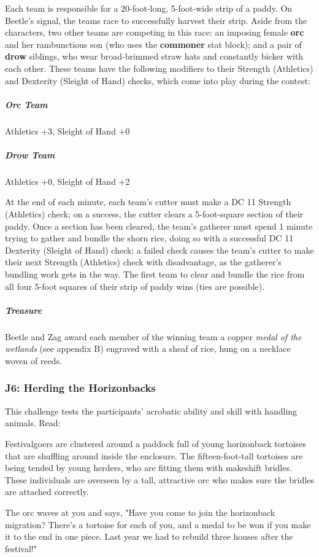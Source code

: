\documentclass[10pt,a4paper,twoside,bg=print,twocolumn,openany,nodeprecatedcode]{dndbook}
\begin{document}
Each team is responsible for a 20-foot-long, 5-foot-wide strip of a paddy. On Beetle's signal, the teams race to successfully harvest their strip. Aside from the characters, two other teams are competing in this race: an imposing female \textbf{orc} and her rambunctious son (who uses the \textbf{commoner} stat block); and a pair of \textbf{drow} siblings, who wear broad-brimmed straw hats and constantly bicker with each other. These teams have the following modifiers to their Strength (Athletics) and Dexterity (Sleight of Hand) checks, which come into play during the contest:

\subparagraph{Orc Team}
Athletics +3, Sleight of Hand +0

\subparagraph{Drow Team}
Athletics +0, Sleight of Hand +2

At the end of each minute, each team's cutter must make a DC 11 Strength (Athletics) check; on a success, the cutter clears a 5-foot-square section of their paddy. Once a section has been cleared, the team's gatherer must spend 1 minute trying to gather and bundle the shorn rice, doing so with a successful DC 11 Dexterity (Sleight of Hand) check; a failed check causes the team's cutter to make their next Strength (Athletics) check with disadvantage, as the gatherer's bundling work gets in the way. The first team to clear and bundle the rice from all four 5-foot squares of their strip of paddy wins (ties are possible).

\subparagraph{Treasure}
Beetle and Zag award each member of the winning team a copper \textit{medal of the wetlands} (see appendix B) engraved with a sheaf of rice, hung on a necklace woven of reeds.

\subsubsection{J6: Herding the Horizonbacks}
This challenge tests the participants' acrobatic ability and skill with handling animals. Read:

\begin{DndReadAloud}{}
Festivalgoers are clustered around a paddock full of young horizonback tortoises that are shuffling around inside the enclosure. The fifteen-foot-tall tortoises are being tended by young herders, who are fitting them with makeshift bridles. These individuals are overseen by a tall, attractive orc who makes sure the bridles are attached correctly.

The orc waves at you and says, "Have you come to join the horizonback migration? There's a tortoise for each of you, and a medal to be won if you make it to the end in one piece. Last year we had to rebuild three houses after the festival!"

\end{DndReadAloud}
\end{document}
